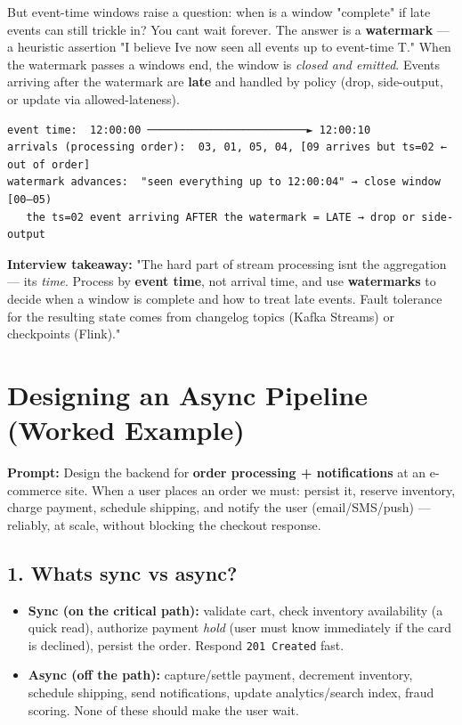\documentclass[11pt]{article}
\providecommand{\tightlist}{\setlength{\itemsep}{1pt}\setlength{\parskip}{0pt}}
\begin{document}
But event-time windows raise a question: when is a window "complete" if late events can still trickle in? You can\textquotesingle t wait forever. The answer is a \textbf{watermark} --- a heuristic assertion "I believe I\textquotesingle ve now seen all events up to event-time T." When the watermark passes a window\textquotesingle s end, the window is \emph{closed and emitted}. Events arriving after the watermark are \textbf{late} and handled by policy (drop, side-output, or update via allowed-lateness).

\setcodelang{}

\begin{verbatim}
event time:  12:00:00 ─────────────────────────► 12:00:10
arrivals (processing order):  03, 01, 05, 04, [09 arrives but ts=02 ← out of order]
watermark advances:  "seen everything up to 12:00:04" → close window [00–05)
   the ts=02 event arriving AFTER the watermark = LATE → drop or side-output
\end{verbatim}

\textbf{Interview takeaway:} "The hard part of stream processing isn\textquotesingle t the aggregation --- it\textquotesingle s \emph{time}. Process by \textbf{event time}, not arrival time, and use \textbf{watermarks} to decide when a window is complete and how to treat late events. Fault tolerance for the resulting state comes from changelog topics (Kafka Streams) or checkpoints (Flink)."

\section{Designing an Async Pipeline (Worked Example)}\label{designing-an-async-pipeline-worked-example}

\textbf{Prompt:} Design the backend for \textbf{order processing + notifications} at an e-commerce site. When a user places an order we must: persist it, reserve inventory, charge payment, schedule shipping, and notify the user (email/SMS/push) --- reliably, at scale, without blocking the checkout response.

\subsection{1. What\textquotesingle s sync vs async?}\label{1-whats-sync-vs-async}

\begin{itemize}
\tightlist
\item
  \textbf{Sync (on the critical path):} validate cart, check inventory availability (a quick read), authorize payment \emph{hold} (user must know immediately if the card is declined), persist the order. Respond \texttt{201\ Created} fast.
\item
  \textbf{Async (off the path):} capture/settle payment, decrement inventory, schedule shipping, send notifications, update analytics/search index, fraud scoring. None of these should make the user wait.
\end{itemize}
\end{document}
